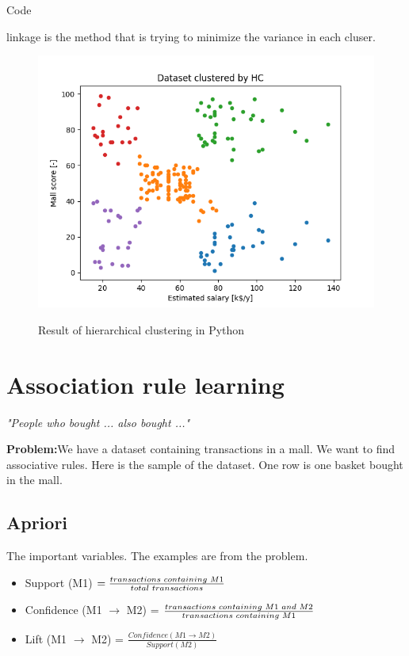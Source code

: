 \documentclass[runningheads,a4paper]{llncs}
\begin{document}
Code

linkage is the method that is trying to minimize the variance in each cluser.

\begin{figure}[H]
\centering
\begin{center}
\includegraphics[scale=0.8]{pics/hc}
\label{uloha1:pic1}
\caption{Result of hierarchical clustering in Python} 
\end{center}
\end{figure}




\newpage

\section{Association rule learning}

\textit{"People who bought ... also bought ..."}

\textbf{Problem:}We have a dataset containing transactions in a mall. We want to find associative rules. Here is the sample of the dataset. One row is one basket bought in the mall. 




\subsection{Apriori}

The important variables. The examples are from the problem.

\begin{itemize}
\item Support (M1) $= \frac{  transactions \text{\space} containing \text{\space} M1}{  total  \text{\space} transactions}$
\item Confidence (M1 $\rightarrow$ M2) = $\frac{transactions  \text{\space} containing \text{\space} M1  \text{\space}and \text{\space}M2}{transactions \text{\space} containing \text{\space}M1}$
\item Lift (M1 $\rightarrow$ M2) = $\frac{Confidence(M1 \rightarrow M2)}{Support(M2)}$
\end{itemize}
\end{document}
